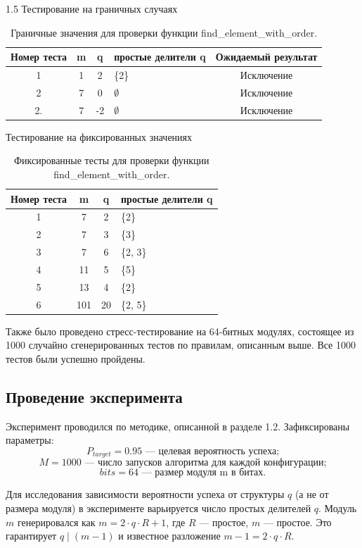 \documentclass[14pt,a4paper]{extarticle}
\begin{document}
\begin{spacing}{1.5}
Тестирование на граничных случаях
\begin{table}[H]
\caption{Граничные значения для проверки функции find\_element\_with\_order.}
\begin{tabularx}{\textwidth}{|c|c|c|X|c|}
\hline
\textbf{Номер теста} & \textbf{m} & \textbf{q} & \textbf{простые делители q} & \textbf{Ожидаемый результат} \\
\hline
1 & 1 & 2 & \{2\} & Исключение \\
\hline
2 & 7 & 0 & \(\emptyset\) & Исключение \\
\hline
2. & 7 & -2 & \(\emptyset\) & Исключение \\
\hline
\end{tabularx}
\end{table}

Тестирование на фиксированных значениях
\begin{table}[H]
\caption{Фиксированные тесты для проверки функции find\_element\_with\_order.}
\begin{tabularx}{\textwidth}{|c|c|c|X|}
\hline
\textbf{Номер теста} & \textbf{m} & \textbf{q} & \textbf{простые делители q} \\
\hline
1 & 7 & 2 & \{2\} \\
\hline
2 & 7 & 3 & \{3\} \\
\hline
3 & 7 & 6 & \{2, 3\} \\
\hline
4 & 11 & 5 & \{5\} \\
\hline
5 & 13 & 4 & \{2\} \\
\hline
6 & 101 & 20 & \{2, 5\} \\
\hline
\end{tabularx}
\end{table}

Также было проведено стресс-тестирование на 64-битных модулях, состоящее из 1000 случайно сгенерированных тестов по правилам, описанным выше. Все 1000 тестов были успешно пройдены.

\subsection{Проведение эксперимента}
Эксперимент проводился по методике, описанной в разделе 1.2. Зафиксированы параметры:
\[ P_{target} = 0.95 \text{ — целевая вероятность успеха;} \]
\[ M = 1000 \text{ — число запусков алгоритма для каждой конфигурации;} \]
\[ bits = 64 \text{ — размер модуля m в битах.} \]

Для исследования зависимости вероятности успеха от структуры \(q\) (а не от размера модуля) в эксперименте варьируется число простых делителей \(q\). Модуль \(m\) генерировался как \(m = 2 \cdot q \cdot R + 1\), где \(R\) — простое, \(m\) — простое. Это гарантирует \(q \mid (m-1)\) и известное разложение \(m-1 = 2 \cdot q \cdot R\).


\end{spacing}
\end{document}
